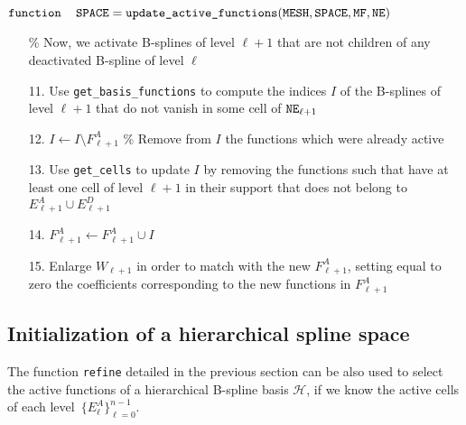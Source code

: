 \documentclass[12pt,a4paper,pdftex]{article}
\theoremstyle{plain}
\theoremstyle{definition}
\theoremstyle{remark}
\DeclareMathOperator\mesh{\texttt{MESH}}
\DeclareMathOperator\basis{\texttt{SPACE}}
\DeclareMathOperator\newcells{\tt NE}
\DeclareMathOperator\functionstoremove{\tt MF}
\newcommand\HH{\mathcal H}
\begin{document}
\begin{algorithm}[H]{$\texttt{function}\quad \basis = \texttt{update\_active\_functions}(\mesh,\basis,\functionstoremove,\newcells)$\;}
{\begin{minipage}{.95\textwidth}
{\begin{enumerate}
{\begin{enumerate}
{\begin{enumerate}
 \end{enumerate}
}
\item[]\% Now, we activate B-splines of level $\ell+1$ that are not children of any deactivated B-spline of level $\ell$\;
\item[11.] Use \texttt{get\_basis\_functions} to compute the indices $I$ of the B-splines of level $\ell+1$ that do not vanish in some cell of $\newcells_{\ell+1}$\;
\item[12.] $I\leftarrow I\setminus F^A_{\ell+1}$ \% Remove from $I$ the functions which were already active\;
\item[13.] Use \texttt{get\_cells} to update $I$ by removing the functions such that have at least one cell of level $\ell+1$ in their support that does not belong to $E^A_{\ell+1}\cup E^D_{\ell+1}$\;
\item[14.] $F^A_{\ell+1}\leftarrow F^A_{\ell+1}\cup I$\;
\item [15.] Enlarge $W_{\ell+1}$ in order to match with the new $F^A_{\ell+1}$, setting equal to zero the coefficients corresponding to the new functions in $F^A_{\ell+1}$\;
\end{enumerate}
}
\end{enumerate}
\medskip
}%
\end{minipage}
}
\end{algorithm}


\newpage

\subsection{Initialization of a hierarchical spline space}

The function \texttt{refine} detailed in the previous section can be also used to select the active functions of a hierarchical B-spline basis $\HH$, if we know the active cells of each level~$\{E^A_\ell\}_{\ell=0}^{n-1}$. 
\end{document}
